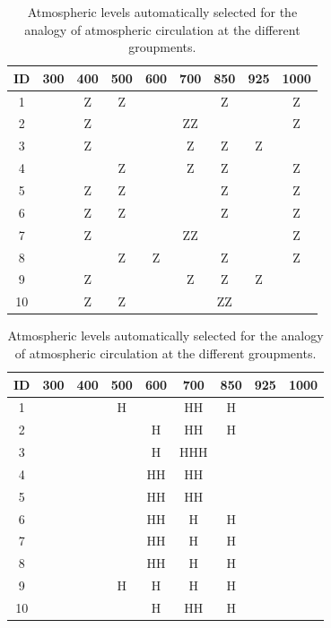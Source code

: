 \documentclass[twocol]{ametsoc}
\begin{document}
\begin{table}[htbp]
	\footnotesize
	\caption{Atmospheric levels automatically selected for the analogy of atmospheric circulation at the different groupments.}
	\begin{center}
		\begin{tabular}{ccccccccc}
			\hline \textbf{ID} & \textbf{300} & \textbf{400} & \textbf{500} & \textbf{600} & \textbf{700} & \textbf{850} & \textbf{925} & \textbf{1000} \\ 
			\hline 
			1  &   & Z & Z &   &   & Z &   & Z \\
			2  &   & Z &   &   & ZZ &   &   & Z \\
			3  &   & Z &   &   & Z & Z & Z &   \\
			4  &   &   & Z &   & Z & Z &   & Z \\
			5  &   & Z & Z &   &   & Z &   & Z \\
			6  &   & Z & Z &   &   & Z &   & Z \\
			7  &   & Z &   &   & ZZ &   &   & Z \\
			8  &   &   & Z & Z &   & Z &   & Z \\
			9  &   & Z &   &   & Z & Z & Z &   \\
			10 &   & Z & Z &   &   & ZZ &   &   \\
			\hline 
		\end{tabular} 
	\end{center}
	\label{table:levels_GA_z4_hi4}
\end{table}

\begin{table}[htbp]
	\footnotesize
	\caption{Atmospheric levels automatically selected for the analogy of atmospheric circulation at the different groupments.}
	\begin{center}
		\begin{tabular}{ccccccccc}
			\hline \textbf{ID} & \textbf{300} & \textbf{400} & \textbf{500} & \textbf{600} & \textbf{700} & \textbf{850} & \textbf{925} & \textbf{1000} \\ 
			\hline 
			1  &   &   & H &   & HH & H &   &   \\
			2  &   &   &   & H & HH & H &   &   \\
			3  &   &   &   & H & HHH &   &   &   \\
			4  &   &   &   & HH & HH &   &   &   \\
			5  &   &   &   & HH & HH &   &   &   \\
			6  &   &   &   & HH & H & H &   &   \\
			7  &   &   &   & HH & H & H &   &   \\
			8  &   &   &   & HH & H & H &   &   \\
			9  &   &   & H & H & H & H &   &   \\
			10 &   &   &   & H & HH & H &   &   \\
			\hline 
		\end{tabular} 
	\end{center}
	\label{table:levels_GA_z4_hi4_H}
\end{table}
\end{document}
